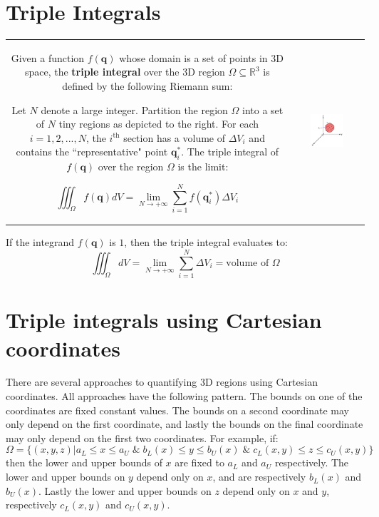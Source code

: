 \documentclass{article}
\begin{document}
\section*{Triple Integrals}


\begin{tabular}{cc}
\parbox{0.5\textwidth}{
Given a function \(f(\mathbf{q})\) whose domain is a set of points in 3D space, the {\bf triple integral} over the 3D region \(\Omega \subseteq \mathbb{R}^3\) is defined by the following Riemann sum:

Let \(N\) denote a large integer. Partition the region \(\Omega\) into a set of \(N\) tiny regions as depicted to the right. For each \(i = 1, 2, ..., N\), the \(i^{\text{th}}\) section has a volume of \(\Delta V_i\) and contains the ``representative" point \(\mathbf{q}_i^*\). The triple integral of \(f(\mathbf{q})\) over the region \(\Omega\) is the limit: 

\[\iiint_{\Omega} f(\mathbf{q})dV = \lim_{N \rightarrow +\infty} \sum_{i=1}^N f(\mathbf{q}_i^*)\Delta V_i\]

} & \parbox{0.5\textwidth}{
\includegraphics[width = 0.5\textwidth]{triple_integral_riemann_sum}
}
\end{tabular}

If the integrand \(f(\mathbf{q})\) is \(1\), then the triple integral evaluates to: 
\[\iiint_{\Omega} dV = \lim_{N \rightarrow +\infty} \sum_{i=1}^N \Delta V_i = \text{volume of \(\Omega\)}\]



\section*{Triple integrals using Cartesian coordinates}

There are several approaches to quantifying 3D regions using Cartesian coordinates. All approaches have the following pattern. The bounds on one of the coordinates are fixed constant values. The bounds on a second coordinate may only depend on the first coordinate, and lastly the bounds on the final coordinate may only depend on the first two coordinates. For example, if: 
\[\Omega = \{(x,y,z) | a_L \leq x \leq a_U \;\&\; b_L(x) \leq y \leq b_U(x) \;\&\; c_L(x,y) \leq z \leq c_U(x,y)\}\]
then the lower and upper bounds of \(x\) are fixed to \(a_L\) and \(a_U\) respectively. The lower and upper bounds on \(y\) depend only on \(x\), and are respectively \(b_L(x)\) and \(b_U(x)\). Lastly the lower and upper bounds on \(z\) depend only on \(x\) and \(y\), respectively \(c_L(x,y)\) and \(c_U(x,y)\). 
\end{document}
